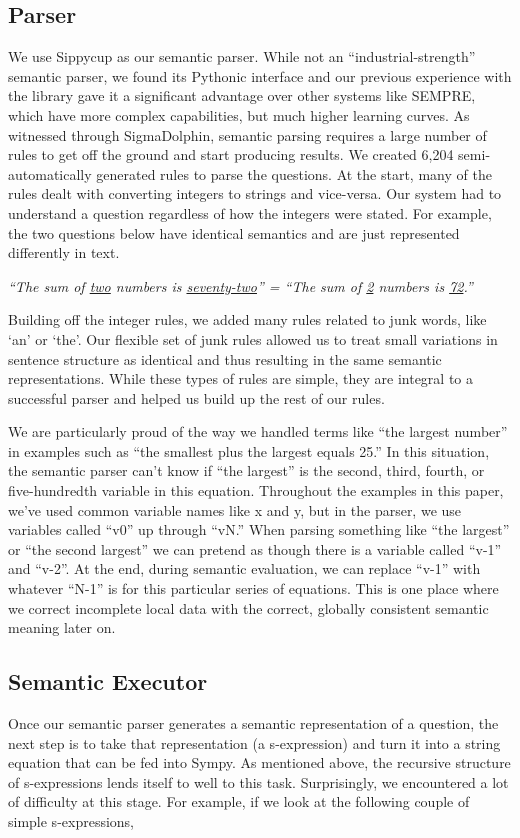 \documentclass[11pt]{article}
\begin{document}
\subsection{Parser}

We use Sippycup as our semantic parser. While not an ``industrial-strength'' semantic parser, we found its Pythonic interface and our previous experience with the library gave it a significant advantage over other systems like SEMPRE, which have more complex capabilities, but much higher learning curves. As witnessed through SigmaDolphin, semantic parsing requires a large number of rules to get off the ground and start producing results. We created 6,204 semi-automatically generated rules to parse the questions. At the start, many of the rules dealt with converting integers to strings and vice-versa. Our system had to understand a question regardless of how the integers were stated. For example, the two questions below have identical semantics and are just represented differently in text.

\textit{``The sum of \underline{two} numbers is \underline{seventy-two}'' = ``The sum of \underline{2} numbers is \underline{72}.''}

Building off the integer rules, we added many rules related to junk words, like ‘an’ or ‘the’. Our flexible set of junk rules allowed us to treat small variations in sentence structure as identical and thus resulting in the same semantic representations. While these types of rules are simple, they are integral to a successful parser and helped us build up the rest of our rules.

We are particularly proud of the way we handled terms like ``the largest number'' in examples such as ``the smallest plus the largest equals 25.'' In this situation, the semantic parser can’t know if ``the largest'' is the second, third, fourth, or five-hundredth variable in this equation. Throughout the examples in this paper, we’ve used common variable names like x and y, but in the parser, we use variables called ``v0'' up through ``vN.'' When parsing something like ``the largest'' or ``the second largest'' we can pretend as though there is a variable called ``v-1'' and ``v-2''. At the end, during semantic evaluation, we can replace ``v-1'' with whatever ``N-1'' is for this particular series of equations. This is one place where we correct incomplete local data with the correct, globally consistent semantic meaning later on.

\subsection{Semantic Executor}
Once our semantic parser generates a semantic representation of a question, the next step is to take that representation (a s-expression) and turn it into a string equation that can be fed into Sympy. As mentioned above, the recursive structure of s-expressions lends itself to well to this task. Surprisingly, we encountered a lot of difficulty at this stage. For example, if we look at the following couple of simple s-expressions,
\end{document}
